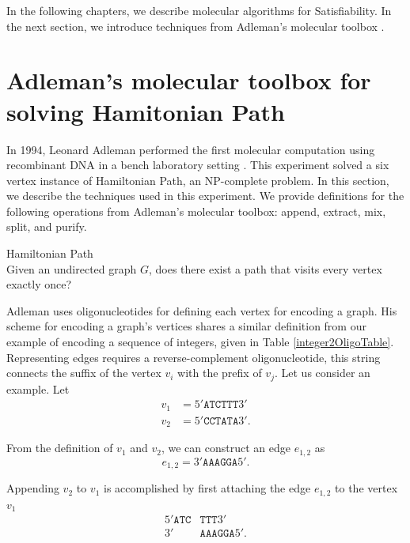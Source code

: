 In the following chapters, we describe molecular algorithms for {\sc Satisfiability}.  In the next section, we introduce techniques from Adleman's molecular toolbox \cite{Adleman:1994:MCS:189441.189442}.

\section{Adleman's molecular toolbox for solving {\sc Hamitonian Path}}
	
In 1994, Leonard Adleman performed the first molecular computation using recombinant DNA in a bench laboratory setting \cite{Adleman:1994:MCS:189441.189442}.  This experiment solved a six vertex instance of {\sc Hamiltonian Path}, an \textsf{NP-complete} problem.  In this section, we describe the techniques used in this experiment. We provide definitions for the following operations from Adleman's molecular toolbox: append, extract, mix, split, and purify.

\begin{definition}
{\sc Hamiltonian Path} \\
Given an undirected graph $G$, does there exist a path that visits every vertex exactly once?

\end{definition}

%


Adleman uses oligonucleotides for defining each vertex for encoding a graph.  His scheme for encoding a graph's vertices shares a similar definition from our example of encoding a sequence of integers, given in Table \ref{integer2OligoTable}.  Representing edges requires a reverse-complement oligonucleotide, this string connects the suffix of the vertex $v_i$ with the prefix of $v_j$.  Let us consider an example.  Let
\begin{align*}
 v_1 &= 5'\texttt{ATCTTT}3' \\
 v_2 &= 5'\texttt{CCTATA}3'.
\end{align*}

\noindent From the definition of $v_1$ and $v_2$, we can construct an edge $e_{1,2}$ as
\[
e_{1,2} = 3'\texttt{AAAGGA}5'.
\]

\noindent Appending $v_2$ to $v_1$ is accomplished by first attaching the edge $e_{1,2}$ to the vertex $v_1$
\begin{align*}
 5'\texttt{ATC}&\texttt{TTT}3' \\
  3'&\texttt{AAAGGA}5'.
\end{align*}

